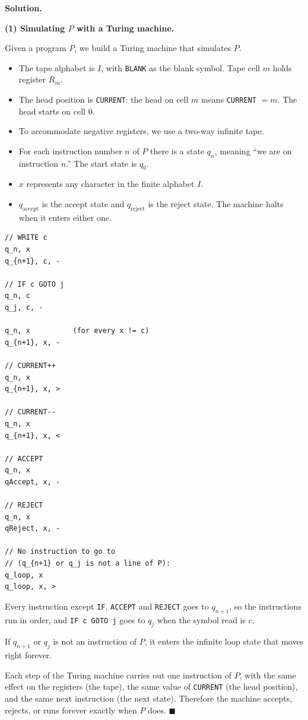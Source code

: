 \documentclass[11pt]{article}
\newenvironment{solution}{%
  \par\noindent\textbf{Solution.}\ \normalfont
}{\hfill$\blacksquare$\par\medskip}
\theoremstyle{plain}
\theoremstyle{definition}
\begin{document}
\begin{solution}
\textbf{(1) Simulating $P$ with a Turing machine.}

Given a program $P$, we build a Turing machine that simulates $P$.

\begin{itemize}
  \item The tape alphabet is $I$, with \texttt{BLANK} as the blank symbol. Tape cell $m$ holds register $R_m$.
  \item The head position is \texttt{CURRENT}: the head on cell $m$ means \texttt{CURRENT} $= m$. The head starts on cell $0$.
  \item To accommodate negative registers, we use a two-way infinite tape.
  \item For each instruction number $n$ of $P$ there is a state $q_n$, meaning ``we are on instruction $n$.'' The start state is $q_0$.
  \item $x$ represents any character in the finite alphabet $I$.
  \item $q_{\mathrm{accept}}$ is the accept state and $q_{\mathrm{reject}}$ is the reject state. The machine halts when it enters either one.
\end{itemize}



\begin{lstlisting}
// WRITE c
q_n, x
q_{n+1}, c, -

// IF c GOTO j
q_n, c
q_j, c, -

q_n, x          (for every x != c)
q_{n+1}, x, -

// CURRENT++
q_n, x
q_{n+1}, x, >

// CURRENT--
q_n, x
q_{n+1}, x, <

// ACCEPT
q_n, x
qAccept, x, -

// REJECT
q_n, x
qReject, x, -

// No instruction to go to
// (q_{n+1} or q_j is not a line of P):
q_loop, x
q_loop, x, >
\end{lstlisting}

Every instruction except \texttt{IF}, \texttt{ACCEPT} and \texttt{REJECT} goes to $q_{n+1}$, so the instructions run in order, and \texttt{IF c GOTO j} goes to $q_j$ when the symbol read is $c$.

If $q_{n+1}$ or $q_j$ is not an instruction of $P$, it enters the infinite loop state that moves right forever.

Each step of the Turing machine carries out one instruction of $P$, with the same effect on the registers (the tape), the same value of \texttt{CURRENT} (the head position), and the same next instruction (the next state). Therefore the machine accepts, rejects, or runs forever exactly when $P$ does.
\end{solution}
\end{document}
